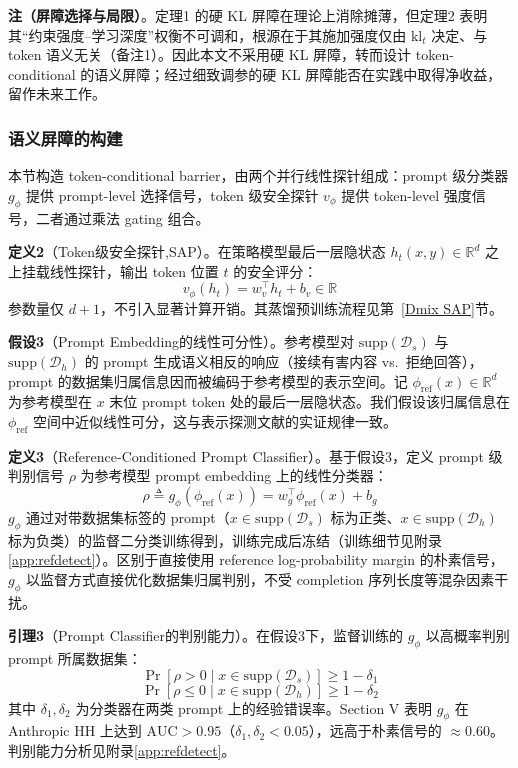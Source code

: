 \documentclass[lettersize,journal]{IEEEtran}
\begin{document}
\textbf{注（屏障选择与局限）}。定理1 的硬 KL 屏障在理论上消除摊薄，但定理2 表明其“约束强度--学习深度”权衡不可调和，根源在于其施加强度仅由 $\text{kl}_t$ 决定、与 token 语义无关（备注1）。因此本文不采用硬 KL 屏障，转而设计 token-conditional 的语义屏障；经过细致调参的硬 KL 屏障能否在实践中取得净收益，留作未来工作。

\subsubsection{语义屏障的构建}\label{sec:semantic-barrier}
本节构造 token-conditional barrier，由两个并行线性探针组成：prompt 级分类器 $g_\phi$ 提供 prompt-level 选择信号，token 级安全探针 $v_\phi$ 提供 token-level 强度信号，二者通过乘法 gating 组合。

\textbf{定义2}（Token级安全探针,SAP）。在策略模型最后一层隐状态 $h_t(x,y) \in \mathbb{R}^d$ 之上挂载线性探针，输出 token 位置 $t$ 的安全评分：
\begin{equation}\label{eq:sap-form}
    v_\phi(h_t) = w_v^\top h_t + b_v \in \mathbb{R}
\end{equation}
参数量仅 $d+1$，不引入显著计算开销。其蒸馏预训练流程见第~\ref{Dmix SAP}节。

\textbf{假设3}（Prompt Embedding的线性可分性）。参考模型对 $\mathrm{supp}(\mathcal{D}_s)$ 与 $\mathrm{supp}(\mathcal{D}_h)$ 的 prompt 生成语义相反的响应（接续有害内容 vs.\ 拒绝回答），prompt 的数据集归属信息因而被编码于参考模型的表示空间。记 $\phi_{\text{ref}}(x) \in \mathbb{R}^d$ 为参考模型在 $x$ 末位 prompt token 处的最后一层隐状态。我们假设该归属信息在 $\phi_{\text{ref}}$ 空间中近似线性可分，这与表示探测文献的实证规律一致\cite{alain2017understanding}。

\textbf{定义3}（Reference-Conditioned Prompt Classifier）。基于假设3，定义 prompt 级判别信号 $\rho$ 为参考模型 prompt embedding 上的线性分类器：
\begin{equation}\label{eq:prompt-classifier}
\rho \triangleq g_\phi(\phi_{\text{ref}}(x)) = w_g^\top \phi_{\text{ref}}(x) + b_g
\end{equation}
$g_\phi$ 通过对带数据集标签的 prompt（$x \in \mathrm{supp}(\mathcal{D}_s)$ 标为正类、$x \in \mathrm{supp}(\mathcal{D}_h)$ 标为负类）的监督二分类训练得到，训练完成后冻结（训练细节见附录\ref{app:refdetect}）。区别于直接使用 reference log-probability margin 的朴素信号，$g_\phi$ 以监督方式直接优化数据集归属判别，不受 completion 序列长度等混杂因素干扰。

\textbf{引理3}（Prompt Classifier的判别能力）。在假设3下，监督训练的 $g_\phi$ 以高概率判别 prompt 所属数据集：
\begin{equation}\label{eq:refdetect-s}
\Pr\left[\rho > 0 \mid x \in \mathrm{supp}(\mathcal{D}_s)\right] \geq 1 - \delta_1
\end{equation}
\begin{equation}\label{eq:refdetect-h}
\Pr\left[\rho \leq 0 \mid x \in \mathrm{supp}(\mathcal{D}_h)\right] \geq 1 - \delta_2
\end{equation}
其中 $\delta_1, \delta_2$ 为分类器在两类 prompt 上的经验错误率。Section V 表明 $g_\phi$ 在 Anthropic HH 上达到 $\text{AUC} > 0.95$（$\delta_1, \delta_2 < 0.05$），远高于朴素信号的 $\approx 0.60$。判别能力分析见附录\ref{app:refdetect}。
\end{document}
